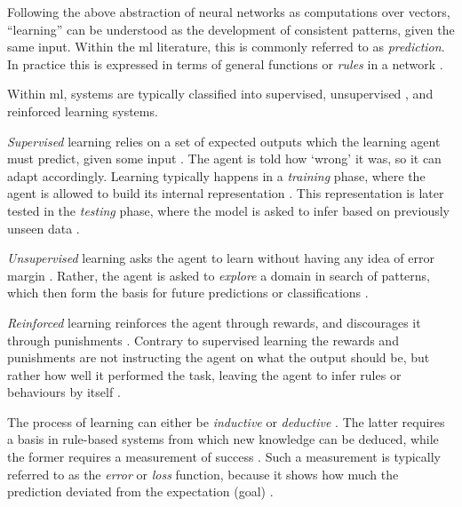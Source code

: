 \documentclass[report.tex]{subfiles}
\begin{document}
Following the above abstraction of neural networks as computations over vectors,
``learning''  can be understood as the development of consistent
patterns, given the same input.
Within the \gls{ml} literature, this is commonly referred to as 
\textit{prediction}. 
In practice this is expressed in terms of general functions or
\textit{rules} in a network \cite[p. 704.]{Russel2007}.

Within \gls{ml}, systems are typically classified into
supervised, 
unsupervised , and reinforced learning systems.

\textit{Supervised} learning relies on a set of expected outputs which 
the learning \gls{agent} must predict, given some input \cite{Russel2007}.
The \gls{agent} is told how `wrong' it was, so it can adapt accordingly.
Learning typically happens in a \textit{training} 
phase, where the \gls{agent} is allowed to build its internal representation 
\cite{Russel2007}.
This representation is later tested in the \textit{testing} phase, 
where the model is asked to infer based on previously unseen data \cite{Russel2007}.

\textit{Unsupervised} learning asks the \gls{agent} to learn without
having any idea of error margin \cite{Russel2007}.
Rather, the \gls{agent} is asked to \textit{explore} a domain in search of
patterns, which then form the basis for future predictions or classifications
\cite{Russel2007}.

\textit{Reinforced} learning reinforces the \gls{agent} through
rewards, and discourages it through punishments \cite{Russel2007}.
Contrary to supervised learning the rewards and punishments are not
instructing the agent on what the output should be, but rather how well
it performed the task, leaving the \gls{agent} to infer rules or
behaviours by itself \cite[p. 873]{Russel2007}.

The process of learning can either be \textit{inductive}
or \textit{deductive} \cite[p. 704]{Russel2007}.
The latter requires a basis in rule-based systems from which new knowledge can
be deduced, while the former requires a measurement of success \cite[p. 705]{Russel2007}.
Such a measurement is typically referred to as the \textit{error} or \textit{loss}
function,
because it shows how much the prediction deviated from the expectation (goal)
\cite{Russel2007}.
\end{document}
